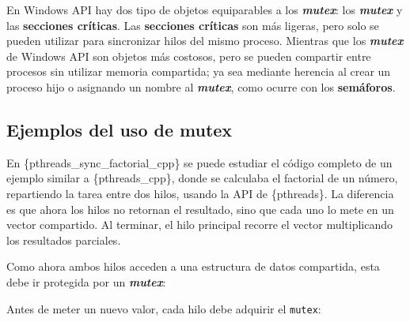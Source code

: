 En Windows API hay dos tipo de objetos equiparables a los
\textbf{\emph{mutex}}: los \textbf{\emph{mutex}} y las \textbf{secciones
críticas}. Las \textbf{secciones críticas} son más ligeras, pero solo se
pueden utilizar para sincronizar hilos del mismo proceso. Mientras que
los \textbf{\emph{mutex}} de Windows API son objetos más costosos, pero
se pueden compartir entre procesos sin utilizar memoria compartida; ya
sea mediante herencia al crear un proceso hijo o asignando un nombre al
\textbf{\emph{mutex}}, como ocurre con los \textbf{semáforos}.

\subsection{Ejemplos del uso de mutex}\label{_ejemplos_del_uso_de_mutex}

En \{pthreads\_sync\_factorial\_cpp\} se puede estudiar el código
completo de un ejemplo similar a \{pthreads\_cpp\}, donde se calculaba
el factorial de un número, repartiendo la tarea entre dos hilos, usando
la API de \{pthreads\}. La diferencia es que ahora los hilos no retornan
el resultado, sino que cada uno lo mete en un vector compartido. Al
terminar, el hilo principal recorre el vector multiplicando los
resultados parciales.

Como ahora ambos hilos acceden a una estructura de datos compartida,
esta debe ir protegida por un \textbf{\emph{mutex}}:

\begin{Shaded}
\begin{Highlighting}[]
\OperatorTok{;}
\OperatorTok{\textless{}}\OperatorTok{\textgreater{}}\OperatorTok{;}
\end{Highlighting}
\end{Shaded}

Antes de meter un nuevo valor, cada hilo debe adquirir el
\texttt{mutex}:

\begin{Shaded}
\begin{Highlighting}[]
\OperatorTok{(}\OperatorTok{);}   
\OperatorTok{(}\OperatorTok{);}
\OperatorTok{(}\OperatorTok{);} 
\end{Highlighting}
\end{Shaded}

